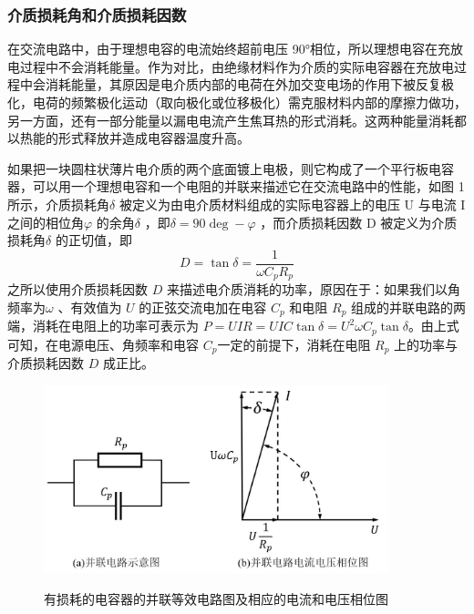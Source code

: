 \documentclass[a4paper,utf8]{article}
\begin{document}
        \subsubsection{介质损耗角和介质损耗因数}
            在交流电路中，由于理想电容的电流始终超前电压 90°相位，所以理想电容在充放电过程中不会消耗能量。作为对比，由绝缘材料作为介质的实际电容器在充放电过程中会消耗能量，其原因是电介质内部的电荷在外加交变电场的作用下被反复极化，电荷的频繁极化运动（取向极化或位移极化）需克服材料内部的摩擦力做功，另一方面，还有一部分能量以漏电电流产生焦耳热的形式消耗。这两种能量消耗都以热能的形式释放并造成电容器温度升高。\par 
            如果把一块圆柱状薄片电介质的两个底面镀上电极，则它构成了一个平行板电容器，可以用一个理想电容和一个电阻的并联来描述它在交流电路中的性能，如图 1 所示，介质损耗角$\delta$ 被定义为由电介质材料组成的实际电容器上的电压 U 与电流 I 之间的相位角$\varphi$ 的余角$\delta$ ，即$\delta  = 90\deg - \varphi$ ，而介质损耗因数 D 被定义为介质损耗角$\delta$ 的正切值，即
            \begin{equation}
                D=\tan\delta=\frac{1}{\omega C_{p}R_{p}}\label{eq7}
            \end{equation}
            之所以使用介质损耗因数 $D$ 来描述电介质消耗的功率，原因在于：如果我们以角频率为$\omega$ 、有效值为 $U$ 的正弦交流电加在电容 $C_p$ 和电阻 $R_p$ 组成的并联电路的两端，消耗在电阻上的功率可表示为 $P = UIR = UIC\tan{\delta } = U^2 \omega C_p \tan{\delta }$。由上式可知，在电源电压、角频率和电容 $C_p$一定的前提下，消耗在电阻 $R_p$ 上的功率与介质损耗因数 $D$ 成正比。
            \begin{figure}[!ht]\centering
                \includegraphics[width=100mm]{fg1.jpg}\
                \caption{有损耗的电容器的并联等效电路图及相应的电流和电压相位图\label{fig:1}}
            \end{figure}
\end{document}
